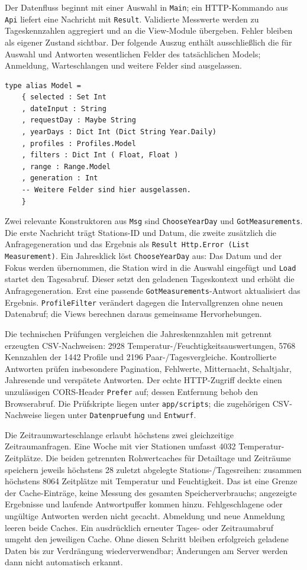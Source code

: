 \documentclass[usegeometry=true]{scrartcl}
\begin{document}
Der Datenfluss beginnt mit einer Auswahl in \texttt{Main}; ein
HTTP-Kommando aus \texttt{Api} liefert eine Nachricht mit
\texttt{Result}. Validierte Messwerte werden zu Tageskennzahlen
aggregiert und an die View-Module übergeben. Fehler bleiben als eigener
Zustand sichtbar. Der folgende Auszug enthält ausschließlich die für
Auswahl und Antworten wesentlichen Felder des tatsächlichen Models;
Anmeldung, Warteschlangen und weitere Felder sind ausgelassen.
\begin{verbatim}
type alias Model =
    { selected : Set Int
    , dateInput : String
    , requestDay : Maybe String
    , yearDays : Dict Int (Dict String Year.Daily)
    , profiles : Profiles.Model
    , filters : Dict Int ( Float, Float )
    , range : Range.Model
    , generation : Int
    -- Weitere Felder sind hier ausgelassen.
    }
\end{verbatim}
Zwei relevante Konstruktoren aus \texttt{Msg} sind
\texttt{ChooseYearDay} und \texttt{GotMeasurements}.
Die erste Nachricht trägt Stations-ID und Datum, die zweite zusätzlich
die Anfragegeneration und das Ergebnis als
\texttt{Result Http.Error (List Measurement)}.
Ein Jahresklick löst \texttt{ChooseYearDay} aus: Das Datum und der Fokus
werden übernommen, die Station wird in die Auswahl eingefügt und
\texttt{Load} startet den Tagesabruf. Dieser setzt den geladenen
Tageskontext und erhöht die Anfragegeneration. Erst eine passende
\texttt{GotMeasurements}-Antwort aktualisiert das Ergebnis.
\texttt{ProfileFilter} verändert dagegen die Intervallgrenzen ohne neuen
Datenabruf; die Views berechnen daraus gemeinsame Hervorhebungen.

Die technischen Prüfungen vergleichen die Jahreskennzahlen mit getrennt
erzeugten CSV-Nachweisen: 2928 Temperatur-/Feuchtigkeitsauswertungen,
5768 Kennzahlen der 1442 Profile und 2196 Paar-/Tagesvergleiche.
Kontrollierte Antworten prüfen insbesondere Pagination, Fehlwerte,
Mitternacht, Schaltjahr, Jahresende und verspätete Antworten.
Der echte HTTP-Zugriff deckte einen unzulässigen CORS-Header
\texttt{Prefer} auf; dessen Entfernung behob den Browserabruf.
Die Prüfskripte liegen unter \texttt{app/scripts}; die zugehörigen
CSV-Nachweise liegen unter \texttt{Datenpruefung} und \texttt{Entwurf}.

Die Zeitraumwarteschlange erlaubt höchstens zwei gleichzeitige
Zeitraumanfragen. Eine Woche mit vier Stationen umfasst 4032
Temperatur-Zeitplätze. Die beiden getrennten Rohwertcaches für Detailtage
und Zeiträume speichern jeweils höchstens 28 zuletzt abgelegte
Stations-/Tagesreihen: zusammen höchstens 8064 Zeitplätze mit Temperatur
und Feuchtigkeit. Das ist eine Grenze der Cache-Einträge, keine Messung
des gesamten Speicherverbrauchs; angezeigte Ergebnisse und laufende
Antwortpuffer kommen hinzu. Fehlgeschlagene oder ungültige Antworten
werden nicht gecacht. Abmeldung und neue Anmeldung leeren beide Caches.
Ein ausdrücklich erneuter Tages- oder Zeitraumabruf umgeht den jeweiligen
Cache. Ohne diesen Schritt bleiben erfolgreich geladene Daten bis zur
Verdrängung wiederverwendbar; Änderungen am Server werden dann nicht
automatisch erkannt.
\end{document}
